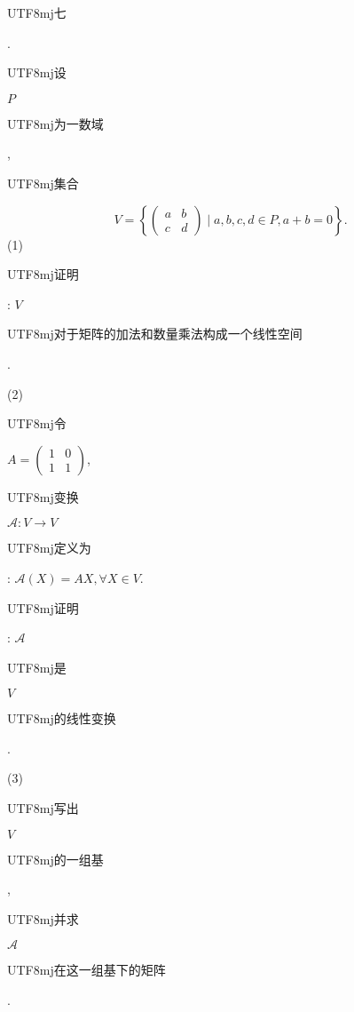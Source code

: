 \documentclass[10pt]{article}
\begin{document}
\begin{CJK}{UTF8}{mj}七\end{CJK}. \begin{CJK}{UTF8}{mj}设\end{CJK} $P$ \begin{CJK}{UTF8}{mj}为一数域\end{CJK}, \begin{CJK}{UTF8}{mj}集合\end{CJK}
$$
V=\left\{\left(\begin{array}{ll}
a & b \\
c & d
\end{array}\right) \mid a, b, c, d \in P, a+b=0\right\} .
$$
(1) \begin{CJK}{UTF8}{mj}证明\end{CJK}: $V$ \begin{CJK}{UTF8}{mj}对于矩阵的加法和数量乘法构成一个线性空间\end{CJK}.

(2) \begin{CJK}{UTF8}{mj}令\end{CJK} $A=\left(\begin{array}{ll}1 & 0 \\ 1 & 1\end{array}\right)$, \begin{CJK}{UTF8}{mj}变换\end{CJK} $\mathscr{A}: V \rightarrow V$ \begin{CJK}{UTF8}{mj}定义为\end{CJK}: $\mathscr{A}(X)=A X, \forall X \in V$. \begin{CJK}{UTF8}{mj}证明\end{CJK}: $\mathscr{A}$ \begin{CJK}{UTF8}{mj}是\end{CJK} $V$ \begin{CJK}{UTF8}{mj}的线性变换\end{CJK}.

(3) \begin{CJK}{UTF8}{mj}写出\end{CJK} $V$ \begin{CJK}{UTF8}{mj}的一组基\end{CJK}, \begin{CJK}{UTF8}{mj}并求\end{CJK} $\mathscr{A}$ \begin{CJK}{UTF8}{mj}在这一组基下的矩阵\end{CJK}.
\end{document}
